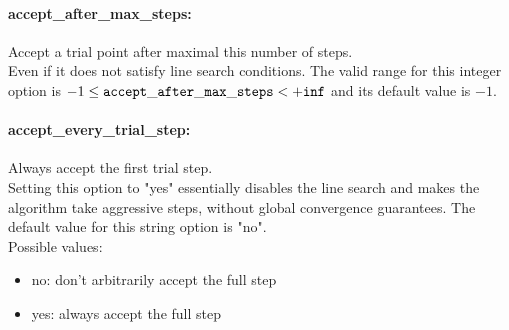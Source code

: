 \paragraph{accept\_after\_max\_steps:}\label{sec:accept_after_max_steps} Accept a trial point after maximal this number of steps. $\;$ \\
 Even if it does not satisfy line search
conditions. The valid range for this integer option is
$-1 \le {\tt accept\_after\_max\_steps } <  {\tt +inf}$
and its default value is $-1$.


\paragraph{accept\_every\_trial\_step:}\label{sec:accept_every_trial_step} Always accept the first trial step. $\;$ \\
 Setting this option to "yes" essentially disables
the line search and makes the algorithm take
aggressive steps, without global convergence
guarantees.
The default value for this string option is "no".
\\ 
Possible values:
\begin{itemize}
   \item no: don't arbitrarily accept the full step
   \item yes: always accept the full step
\end{itemize}

